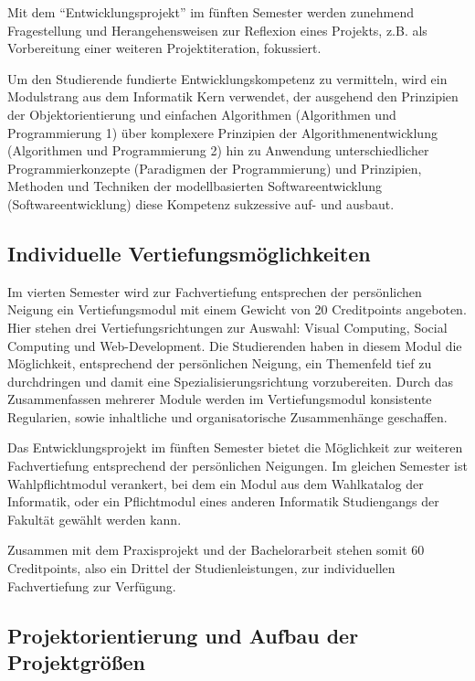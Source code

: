 Mit dem ``Entwicklungsprojekt'' im fünften Semester werden zunehmend
Fragestellung und Herangehensweisen zur Reflexion eines Projekts, z.B.
als Vorbereitung einer weiteren Projektiteration, fokussiert.

Um den Studierende fundierte Entwicklungskompetenz zu vermitteln, wird
ein Modulstrang aus dem Informatik Kern verwendet, der ausgehend den
Prinzipien der Objektorientierung und einfachen Algorithmen (Algorithmen
und Programmierung 1) über komplexere Prinzipien der
Algorithmenentwicklung (Algorithmen und Programmierung 2) hin zu
Anwendung unterschiedlicher Programmierkonzepte (Paradigmen der
Programmierung) und Prinzipien, Methoden und Techniken der
modellbasierten Softwareentwicklung (Softwareentwicklung) diese
Kompetenz sukzessive auf- und ausbaut.

\subsection{Individuelle
Vertiefungsmöglichkeiten}\label{individuelle-vertiefungsmuxf6glichkeiten}

Im vierten Semester wird zur Fachvertiefung entsprechen der persönlichen
Neigung ein Vertiefungsmodul mit einem Gewicht von 20 Creditpoints
angeboten. Hier stehen drei Vertiefungsrichtungen zur Auswahl: Visual
Computing, Social Computing und Web-Development. Die Studierenden haben
in diesem Modul die Möglichkeit, entsprechend der persönlichen Neigung,
ein Themenfeld tief zu durchdringen und damit eine
Spezialisierungsrichtung vorzubereiten. Durch das Zusammenfassen
mehrerer Module werden im Vertiefungsmodul konsistente Regularien, sowie
inhaltliche und organisatorische Zusammenhänge geschaffen.

Das Entwicklungsprojekt im fünften Semester bietet die Möglichkeit zur
weiteren Fachvertiefung entsprechend der persönlichen Neigungen. Im
gleichen Semester ist Wahlpflichtmodul verankert, bei dem ein Modul aus
dem Wahlkatalog der Informatik, oder ein Pflichtmodul eines anderen
Informatik Studiengangs der Fakultät gewählt werden kann.

Zusammen mit dem Praxisprojekt und der Bachelorarbeit stehen somit 60
Creditpoints, also ein Drittel der Studienleistungen, zur individuellen
Fachvertiefung zur Verfügung.

\subsection{Projektorientierung und Aufbau der
Projektgrößen}\label{projektorientierung-und-aufbau-der-projektgruxf6uxdfen}

